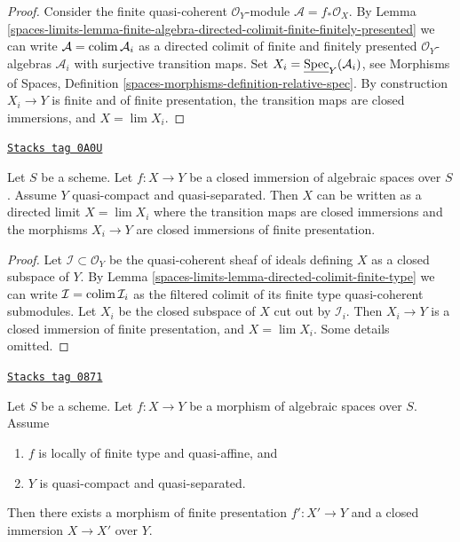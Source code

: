 \begin{proof}
Consider the finite quasi-coherent $\mathcal{O}_Y$-module
$\mathcal{A} = f_*\mathcal{O}_X$. By
Lemma \ref{spaces-limits-lemma-finite-algebra-directed-colimit-finite-finitely-presented}
we can write $\mathcal{A} = \operatorname{colim} \mathcal{A}_i$ as a directed
colimit of finite and finitely presented $\mathcal{O}_Y$-algebras
$\mathcal{A}_i$ with surjective transition maps.
Set $X_i = \underline{\operatorname{Spec}}_Y(\mathcal{A}_i)$, see
Morphisms of Spaces, Definition
\ref{spaces-morphisms-definition-relative-spec}.
By construction $X_i \to Y$ is finite and of finite presentation,
the transition maps are closed immersions, and $X = \lim X_i$.
\end{proof}

\begin{lemma}
\label{spaces-limits-lemma-closed-is-limit-closed-and-finite-presentation}
\href{https://stacks.math.columbia.edu/tag/0A0U}{\texttt{Stacks tag 0A0U}}


Let $S$ be a scheme. Let $f : X \to Y$ be a closed immersion of algebraic
spaces over $S$. Assume $Y$ quasi-compact and quasi-separated.
Then $X$ can be written as a directed limit $X = \lim X_i$
where the transition maps are closed immersions and the morphisms
$X_i \to Y$ are closed immersions of finite presentation.
\end{lemma}

\begin{proof}
Let $\mathcal{I} \subset \mathcal{O}_Y$ be the quasi-coherent sheaf
of ideals defining $X$ as a closed subspace of $Y$. By
Lemma \ref{spaces-limits-lemma-directed-colimit-finite-type}
we can write $\mathcal{I} = \operatorname{colim} \mathcal{I}_i$ as the
filtered colimit of its finite type quasi-coherent submodules.
Let $X_i$ be the closed subspace of $X$ cut out by $\mathcal{I}_i$.
Then $X_i \to Y$ is a closed immersion of finite presentation,
and $X = \lim X_i$. Some details omitted.
\end{proof}

\begin{lemma}
\label{spaces-limits-lemma-quasi-affine-closed-in-finite-presentation}
\href{https://stacks.math.columbia.edu/tag/0871}{\texttt{Stacks tag 0871}}

Let $S$ be a scheme. Let $f : X \to Y$ be a morphism of algebraic spaces
over $S$. Assume
\begin{enumerate}
\item $f$ is locally of finite type and quasi-affine, and
\item $Y$ is quasi-compact and quasi-separated.
\end{enumerate}
Then there exists a morphism of finite presentation
$f' : X' \to Y$ and a closed immersion $X \to X'$ over $Y$.
\end{lemma}

